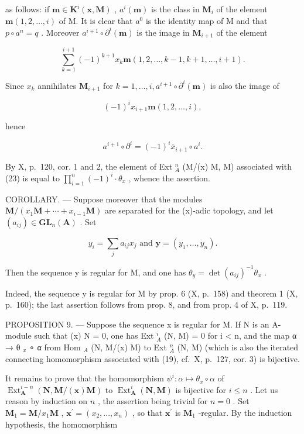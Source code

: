 as follows: if \(\boldsymbol{m} \in \mathbf{K}^i(\boldsymbol{x}, \mathbf{M})\) , \(a^i(\boldsymbol{m})\) is the class in \(\mathbf{M}_i\) of the element \(\boldsymbol{m}(1, 2, \ldots, i)\) of M. It is clear that \(a^0\) is the identity map of M and that \(p \circ a^n = q\) . Moreover \(a^{i+1} \circ \partial^i(\boldsymbol{m})\) is the image in \(\mathbf{M}_{i+1}\) of the element

\[
\sum_ {k = 1} ^ {i + 1} (- 1) ^ {k + 1} x _ {k} \boldsymbol {m} (1, 2, \dots , k - 1, k + 1, \dots , i + 1).
\]

Since \(x_{k}\) annihilates \(\mathbf{M}_{i+1}\) for \(k=1,\ldots,i,a^{i+1}\circ\partial^{i}(\boldsymbol{m})\) is also the image of

\[
(- 1) ^ {i} x _ {i + 1} \boldsymbol {m} (1, 2, \dots , i),
\]

hence

\[
a ^ {i + 1} \circ \partial^ {i} = (- 1) ^ {i} \overline {{{x}}} _ {i + 1} \circ a ^ {i}.
\]

By X, p.~120, cor. 1 and 2, the element of Ext \(_{A}^{n}\) (M/(x) M, M) associated with (23) is equal to \(\prod_{i=1}^{n} (-1)^{i} \cdot \theta_{x}\) , whence the assertion.

COROLLARY. — Suppose moreover that the modules \(\mathbf{M}/(x_{1}\mathbf{M}+\cdots+x_{i-1}\mathbf{M})\) are separated for the (x)-adic topology, and let \((a_{ij})\in\mathbf{GL}_{n}(\mathbf{A})\) . Set

\[
y _ {i} = \sum_ {j} a _ {i j} x _ {j} \text { and } \mathbf {y} = (y _ {1}, \dots , y _ {n}).
\]

Then the sequence y is regular for M, and one has \(\theta_{y} = \det (a_{ij})^{-1}\theta_{x}\) .

Indeed, the sequence y is regular for M by prop. 6 (X, p.~158) and theorem 1 (X, p.~160); the last assertion follows from prop. 8, and from prop. 4 of X, p.~119.

PROPOSITION 9. — Suppose the sequence x is regular for M. If N is an A-module such that (x) N = 0, one has Ext \(_{A}^{i}\) (N, M) = 0 for i \textless{} n, and the map α → θ \(_{x}\) ∘ α from Hom \(_{A}\) (N, M/(x) M) to Ext \(_{A}^{n}\) (N, M) (which is also the iterated connecting homomorphism associated with (19), cf.~X, p.~127, cor. 3) is bijective.

It remains to prove that the homomorphism \(\psi^{i}:\alpha\mapsto\theta_{x}\circ\alpha\) of \(\operatorname{Ext}_{\mathbf{A}}^{i-n}(\mathbf{N},\mathbf{M}/(\mathbf{x})\mathbf{M})\) to \(\operatorname{Ext}_{\mathbf{A}}^{i}(\mathbf{N},\mathbf{M})\) is bijective for \(i\leqslant n\) . Let us reason by induction on \(n\) , the assertion being trivial for \(n=0\) . Set \(\mathbf{M}_{1}=\mathbf{M}/x_{1}\mathbf{M}\) , \(\mathbf{x}^{\prime}=(x_{2},...,x_{n})\) , so that \(\mathbf{x}^{\prime}\) is \(\mathbf{M}_{1}\) -regular. By the induction hypothesis, the homomorphism

